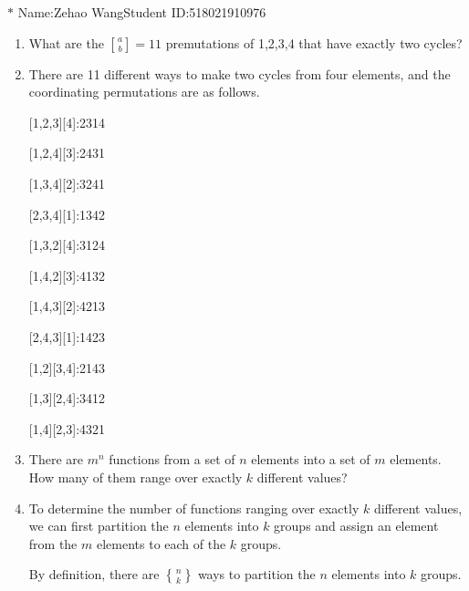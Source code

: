 \documentclass[12pt,a4paper]{article}
\makeatletter
\newtheorem*{solution}{Solution}
\theoremstyle{definition}
\renewenvironment{solution}[1][Solution] {\par\pushQED{\qed}\normalfont\topsep6\p@\@plus6\p@\relax\trivlist\item[\hskip\labelsep\bfseries#1\@addpunct{.}]\ignorespaces}{\popQED\endtrivlist\@endpefalse} \makeatother
\makeatother
\begin{document}
\noindent

\noindent{}
\begin{center}
\footnotesize{\color{blue}$*$ Name:Zehao Wang\quad Student ID:518021910976}
\end{center}

\begin{enumerate}
    \item 
        What are the ${a \brack b}=11$ premutations of {1,2,3,4} that have exactly two cycles?
        \begin{solution}
        There are 11 different ways to make two cycles from four elements, and the coordinating permutations are as follows.
        	
        	    [1,2,3][4]:2314
        	 
        	    [1,2,4][3]:2431
        	 
        	    [1,3,4][2]:3241
        	 
        	    [2,3,4][1]:1342
        	 
        	    [1,3,2][4]:3124
        
        	    [1,4,2][3]:4132
        	 
        	    [1,4,3][2]:4213
        	 
        	    [2,4,3][1]:1423
        	 
        	    [1,2][3,4]:2143
        	 
        	    [1,3][2,4]:3412
        	 
        	    [1,4][2,3]:4321
        
        \end{solution}
    \item  
       There are $m^n$ functions from a set of $n$ elements into a set of $m$ elements. How many of them range over exactly $k$ different values?
       \begin{solution}
       	    To determine the number of functions ranging over exactly $k$ different values, we can first partition the $n$ elements into $k$ groups and assign an element from the $m$ elements to each of the $k$ groups.
       	    
       	    By definition, there are $ n \brace k$ ways to partition the $n$ elements into $k$ groups.
       	    

\end{solution}
\end{enumerate}
\end{document}
